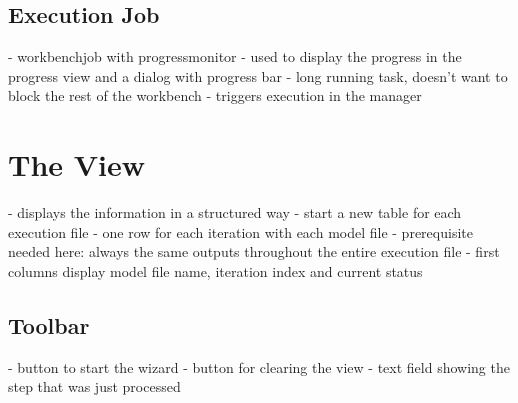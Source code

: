 \subsection{Execution Job}
- workbenchjob with progressmonitor
- used to display the progress in the progress view and a dialog with progress bar
- long running task, doesn't want to block the rest of the workbench 
- triggers execution in the manager

\section{The View}
- displays the information in a structured way
- start a new table for each execution file
- one row for each iteration with each model file
 - prerequisite needed here: always the same outputs throughout the entire execution file
- first columns display model file name, iteration index and current status

\subsection{Toolbar}
- button to start the wizard
- button for clearing the view
- text field showing the step that was just processed
